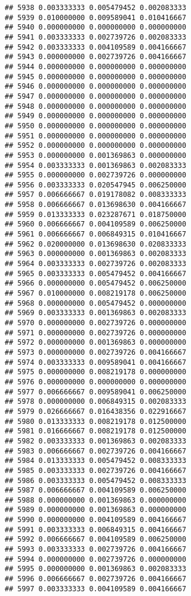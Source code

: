 \documentclass[
]{article}
\begin{document}
\begin{verbatim}
## 5938 0.003333333 0.005479452 0.002083333
## 5939 0.010000000 0.009589041 0.010416667
## 5940 0.000000000 0.000000000 0.000000000
## 5941 0.003333333 0.002739726 0.002083333
## 5942 0.003333333 0.004109589 0.004166667
## 5943 0.000000000 0.002739726 0.004166667
## 5944 0.000000000 0.000000000 0.000000000
## 5945 0.000000000 0.000000000 0.000000000
## 5946 0.000000000 0.000000000 0.000000000
## 5947 0.000000000 0.000000000 0.000000000
## 5948 0.000000000 0.000000000 0.000000000
## 5949 0.000000000 0.000000000 0.000000000
## 5950 0.000000000 0.000000000 0.000000000
## 5951 0.000000000 0.000000000 0.000000000
## 5952 0.000000000 0.000000000 0.000000000
## 5953 0.000000000 0.001369863 0.000000000
## 5954 0.003333333 0.001369863 0.002083333
## 5955 0.000000000 0.002739726 0.000000000
## 5956 0.003333333 0.020547945 0.006250000
## 5957 0.006666667 0.019178082 0.008333333
## 5958 0.006666667 0.013698630 0.004166667
## 5959 0.013333333 0.023287671 0.018750000
## 5960 0.006666667 0.004109589 0.006250000
## 5961 0.006666667 0.006849315 0.010416667
## 5962 0.020000000 0.013698630 0.020833333
## 5963 0.000000000 0.001369863 0.002083333
## 5964 0.003333333 0.002739726 0.002083333
## 5965 0.003333333 0.005479452 0.004166667
## 5966 0.000000000 0.005479452 0.006250000
## 5967 0.010000000 0.008219178 0.006250000
## 5968 0.000000000 0.005479452 0.000000000
## 5969 0.003333333 0.001369863 0.002083333
## 5970 0.000000000 0.002739726 0.000000000
## 5971 0.000000000 0.002739726 0.000000000
## 5972 0.000000000 0.001369863 0.000000000
## 5973 0.000000000 0.002739726 0.004166667
## 5974 0.003333333 0.009589041 0.004166667
## 5975 0.000000000 0.008219178 0.000000000
## 5976 0.000000000 0.000000000 0.000000000
## 5977 0.006666667 0.009589041 0.006250000
## 5978 0.000000000 0.006849315 0.002083333
## 5979 0.026666667 0.016438356 0.022916667
## 5980 0.013333333 0.008219178 0.012500000
## 5981 0.016666667 0.008219178 0.012500000
## 5982 0.003333333 0.001369863 0.002083333
## 5983 0.006666667 0.002739726 0.004166667
## 5984 0.013333333 0.005479452 0.008333333
## 5985 0.003333333 0.002739726 0.004166667
## 5986 0.003333333 0.005479452 0.008333333
## 5987 0.006666667 0.004109589 0.006250000
## 5988 0.000000000 0.001369863 0.000000000
## 5989 0.000000000 0.001369863 0.000000000
## 5990 0.000000000 0.004109589 0.004166667
## 5991 0.003333333 0.006849315 0.004166667
## 5992 0.006666667 0.004109589 0.006250000
## 5993 0.003333333 0.002739726 0.004166667
## 5994 0.000000000 0.002739726 0.000000000
## 5995 0.000000000 0.001369863 0.002083333
## 5996 0.006666667 0.002739726 0.004166667
## 5997 0.003333333 0.004109589 0.004166667

\end{verbatim}
\end{document}
